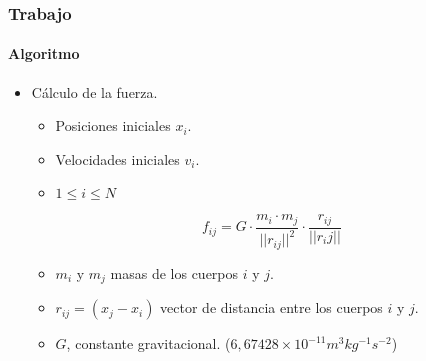 \frame
{
\frametitle{Trabajo}
\framesubtitle{Algoritmo}

\begin{itemize}
    \item Cálculo de la fuerza.
    \begin{itemize}
        \item Posiciones iniciales $x_i$.
        \item Velocidades iniciales $v_i$.
        \item $1 \leq i \leq N$
    \end{itemize}
    $$f_{ij} =G \cdot \frac{m_i \cdot m_j}{||r_{ij}||^{2}} \cdot \frac{r_{ij}}{||r_ij||}$$
    \begin{itemize}
        \item $m_i$ y $m_j$ masas de los cuerpos $i$ y $j$.
        \item $r_{ij} = (x_j - x_i )$ vector de distancia entre los cuerpos $i$ y $j$.
        \item $G$, constante gravitacional. ($6,67428 \times 10^{-11} m^{3} kg^{-1} s^{-2}$)
    \end{itemize}
\end{itemize}
}



